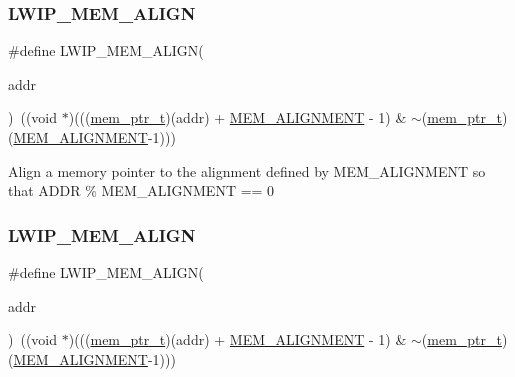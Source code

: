 \subsubsection{\texorpdfstring{L\+W\+I\+P\+\_\+\+M\+E\+M\+\_\+\+A\+L\+I\+GN}{LWIP\_MEM\_ALIGN}\hspace{0.1cm}{\footnotesize\ttfamily [1/2]}}
{\footnotesize\ttfamily \#define L\+W\+I\+P\+\_\+\+M\+E\+M\+\_\+\+A\+L\+I\+GN(\begin{DoxyParamCaption}\item[{}]{addr }\end{DoxyParamCaption})~((void $\ast$)(((\hyperlink{group__compiler__abstraction_gaf019cbb71af10dcfda7758b21e655307}{mem\+\_\+ptr\+\_\+t})(addr) + \hyperlink{group__lwip__opts__mem_ga97343214666ee6dcb18c0bd77b441ea7}{M\+E\+M\+\_\+\+A\+L\+I\+G\+N\+M\+E\+NT} -\/ 1) \& $\sim$(\hyperlink{group__compiler__abstraction_gaf019cbb71af10dcfda7758b21e655307}{mem\+\_\+ptr\+\_\+t})(\hyperlink{group__lwip__opts__mem_ga97343214666ee6dcb18c0bd77b441ea7}{M\+E\+M\+\_\+\+A\+L\+I\+G\+N\+M\+E\+NT}-\/1)))}

Align a memory pointer to the alignment defined by M\+E\+M\+\_\+\+A\+L\+I\+G\+N\+M\+E\+NT so that A\+D\+DR \% M\+E\+M\+\_\+\+A\+L\+I\+G\+N\+M\+E\+NT == 0 \mbox{\label{group__compiler__abstraction_gaa8e8724eb1c220cbbb90de9e175ce1dc}} 
\subsubsection{\texorpdfstring{L\+W\+I\+P\+\_\+\+M\+E\+M\+\_\+\+A\+L\+I\+GN}{LWIP\_MEM\_ALIGN}\hspace{0.1cm}{\footnotesize\ttfamily [2/2]}}
{\footnotesize\ttfamily \#define L\+W\+I\+P\+\_\+\+M\+E\+M\+\_\+\+A\+L\+I\+GN(\begin{DoxyParamCaption}\item[{}]{addr }\end{DoxyParamCaption})~((void $\ast$)(((\hyperlink{group__compiler__abstraction_gaf019cbb71af10dcfda7758b21e655307}{mem\+\_\+ptr\+\_\+t})(addr) + \hyperlink{group__lwip__opts__mem_ga97343214666ee6dcb18c0bd77b441ea7}{M\+E\+M\+\_\+\+A\+L\+I\+G\+N\+M\+E\+NT} -\/ 1) \& $\sim$(\hyperlink{group__compiler__abstraction_gaf019cbb71af10dcfda7758b21e655307}{mem\+\_\+ptr\+\_\+t})(\hyperlink{group__lwip__opts__mem_ga97343214666ee6dcb18c0bd77b441ea7}{M\+E\+M\+\_\+\+A\+L\+I\+G\+N\+M\+E\+NT}-\/1)))}

